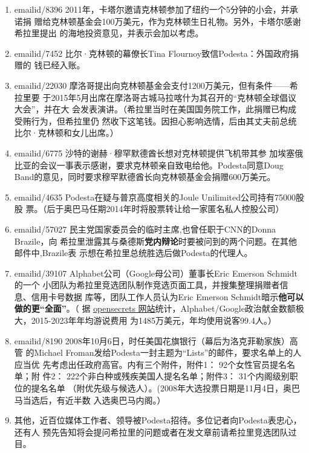 \begin{enumerate}
\item emailid/8396 2011年，卡塔尔邀请克林顿参加了纽约一个5分钟的小会，并承诺捐
  赠给克林顿基金会100万美元，作为克林顿生日礼物。另外，卡塔尔感谢希拉里提出
  的海地投资意见，并表示会加以考虑。

\item emailid/7452 比尔·克林顿的幕僚长Tina Flournoy致信Podesta：外国政府捐赠的
  钱已经入账。

\item emailid/22030 摩洛哥提出向克林顿基金会支付1200万美元，但有条件——希拉里要
  于2015年5月出席在摩洛哥古城马拉喀什为其召开的“克林顿全球倡议大会”，并在大
  会发表演讲。（希拉里当时在美国国务院工作，此捐赠已构成受贿行为，但希拉里仍
  然收下这笔钱。因担心影响选情，后由其丈夫前总统比尔·克林顿和女儿出席。）

\item emailid/6775 沙特的谢赫·穆罕默德酋长想对克林顿提供飞机带其参
  加埃塞俄比亚的会议一事表示感谢，要求克林顿亲自致电给他。Podesta同意Doug
  Band的意见，同时要求穆罕默德酋长向克林顿基金会捐赠600万美元。

\item emailid/4635 Podesta在疑与普京高度相关的Joule Unilimited公司持有75000股股
  票。（后于奥巴马任期2014年时将股票转让给一家匿名私人控股公司）

\item emailid/57027 民主党国家委员会的临时主席,也曾任职于CNN的Donna Brazile，向
  希拉里泄露其与桑德斯\textbf{党内辩论}时要被问到的两个问题。在其他邮件中,Brazile表
  示想在希拉里总统胜选后做Podesta的代理人。

\item emailid/39107 Alphabet公司（Google母公司）董事长Eric Emerson Schmidt的一个
  小团队为希拉里竞选团队制作竞选页面工具，并搜集整理捐赠者信息、信用卡号数据
  库等，团队工作人员认为Eric Emerson Schmidt暗示\textbf{他可以做的更“全面”}。（
  据
  \href{https://www.opensecrets.org/federal-lobbying/clients/summary?cycle=2019&id=D000067823}{opensecrets
    网站}统计，Alphabet/Google政治献金数额极大，2015-2023年年均游说费用
  为1485万美元，年均使用说客99.4人。）

\item emailid/8190 2008年10月6日，时任美国花旗银行（幕后为洛克菲勒家族）高管
  的Michael Froman发给Podesta一封主题为“Lists”的邮件，要求名单上的人应当优
  先考虑出任政府高官。内有三个附件，附件1： 92个女性官员提名名单；附
  件2： 222个非白种或残疾美国人提名名单；附件3： 31个内阁级别职位的提名名单
  （附优先级与候选人）。(2008年大选投票日期是11月4日，奥巴马当选后，有近半数
  入选奥巴马内阁。）

\item 其他，近百位媒体工作者、领导被Podesta招待。多位记者向Podesta表忠心，还有人
  预先告知将会提问希拉里的问题或者在发文章前请希拉里竞选团队过目。
\end{enumerate}


